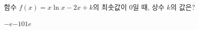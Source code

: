 함수 $f(x)=x\ln x-2x+k$의 최솟값이 $0$일 때, 상수 $k$의 값은?
\begin{choices32}{$-e$}{$-1$}{$0$}{$1$}{$e$}\end{choices32}
